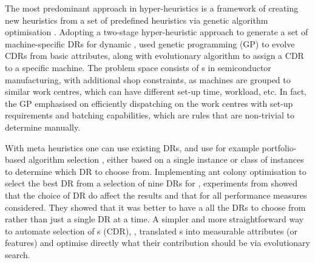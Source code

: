 \documentclass[twocolumn]{svjour3}
\begin{document}
The most predominant approach in hyper-heuristics is a framework of creating 
new heuristics from a set of predefined heuristics via genetic algorithm 
optimisation \cite{Burke10}. 
Adopting a two-stage hyper-heuristic approach to generate a set of 
machine-specific DRs for dynamic \jsp, \cite{Pickardt2013} used genetic 
programming (GP) to evolve CDRs from basic attributes, along with evolutionary 
algorithm to assign a CDR to a specific machine. 
The problem space consists of \jsp s in semiconductor manufacturing, with 
additional shop constraints, as machines are grouped to similar work centres, 
which can have different set-up time, workload, etc. 
In fact, the GP emphasised on efficiently dispatching on the work centres with 
set-up requirements and batching capabilities, which are rules that are 
non-trivial to determine manually.

With meta heuristics one can use existing DRs, and use for example 
portfolio-based algorithm selection \cite{Rice76,Gomes01,Xu07}, either based on 
a single instance or class of instances to determine which DR to choose from. 
Implementing ant colony optimisation to select the best DR 
from a selection of nine DRs for \JSP, experiments from \cite{Korytkowski13} 
showed that the choice of DR do affect the results and that for all performance 
measures considered. They showed that it was better to have a all the DRs to 
choose from rather than just a single DR at a time.
%
A simpler and more straightforward way to automate selection of \cdr s (CDR), 
\cite{InRu14}, translated \dr s into measurable attributes (or features) and 
optimise directly what their contribution should be via evolutionary search. 
\end{document}
